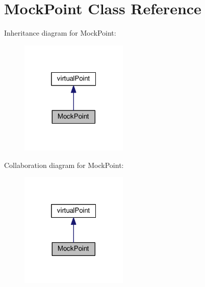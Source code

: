 \hypertarget{classMockPoint}{}\section{Mock\+Point Class Reference}
\label{classMockPoint}


Inheritance diagram for Mock\+Point\+:
\nopagebreak
\begin{figure}[H]
\begin{center}
\leavevmode
\includegraphics[width=145pt]{classMockPoint__inherit__graph}
\end{center}
\end{figure}


Collaboration diagram for Mock\+Point\+:
\nopagebreak
\begin{figure}[H]
\begin{center}
\leavevmode
\includegraphics[width=145pt]{classMockPoint__coll__graph}
\end{center}
\end{figure}
